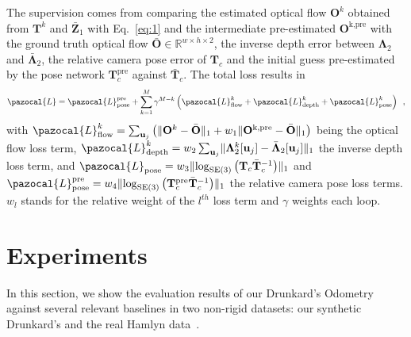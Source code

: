 \documentclass{article}
\newcommand{\Lb}{\pazocal{L}}
\begin{document}
The supervision comes from comparing the estimated optical flow $\mathbf{O}^k$ obtained from  $\mathbf{T}^k$ and $\bar{\mathbf{Z}}_1$ with Eq.~\ref{eq:1} and the intermediate pre-estimated $\mathbf{O}^\text{k,pre}$ with the ground truth optical flow $\bar{\mathbf{O}} \in \mathbb{R}^{w\times h\times 2}$, the inverse depth error between $\mathbf{\Lambda}_2$ and $\bar{\mathbf{\Lambda}}_2$, the relative camera pose error of $\mathbf{T}_c$ and the initial guess pre-estimated by the pose network $\mathbf{T}_c^\text{pre}$ against $\bar{\mathbf{T}}_c$. The total loss results in
\begin{equation}
   \Lb = \Lb_{\text{pose}}^\text{pre} + \sum_{k=1}^{M} \gamma^{M-k} \left( \Lb_\text{flow}^k + \Lb_\text{depth}^k + \Lb_\text{pose}^k     \right) \enspace, 
\label{eq:3}
\end{equation}
with $\Lb_\text{flow}^k = \sum_{\mathbf{u}_j} \left( \lVert \mathbf{O}^k - \bar{\mathbf{O}} \rVert_1 + w_1 \lVert \mathbf{O}^\text{k,pre} - \bar{\mathbf{O}} \rVert_1 \right)$ being the optical flow loss term, $\Lb_\text{depth}^k = w_2 \sum_{\mathbf{u}_j} \lVert \mathbf{\Lambda}_2^k[\mathbf{u}_j] - \bar{\mathbf{\Lambda}}_2[\mathbf{u}_j] \rVert_1$ the inverse depth loss term, and $\Lb_{\text{pose}} = w_3 \lVert \log_{\ensuremath{\mathrm{SE}(3)}}\left(\mathbf{T}_c \bar{\mathbf{T}}_c^{-1} \right) \rVert_1 $ and $\Lb_{\text{pose}}^{\text{pre}} = w_4 \lVert \log_{\ensuremath{\mathrm{SE}(3)}}\left(\mathbf{T}^{\text{pre}}_c \bar{\mathbf{T}}_c^{-1} \right) \rVert_1$ the relative camera pose loss terms. $w_l$ stands for the relative weight of the $l^{th}$ loss term and $\gamma$ weights each loop.



\section{Experiments}  \label{sec:experiments}
In this section, we show the evaluation results of our Drunkard's Odometry against several relevant baselines in two non-rigid datasets: our synthetic Drunkard's and the real Hamlyn data~\cite{mountney2010three,stoyanov2005soft,stoyanov2010real,pratt2010dynamic}.
\end{document}
